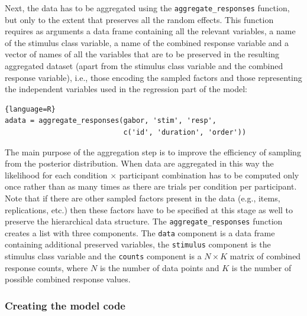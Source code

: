 \documentclass[oneside,a4paper]{article}
\begin{document}
Next, the data has to be aggregated using the
\texttt{aggregate\_responses} function, but only to the extent that
preserves all the random effects. This function requires as arguments
a data frame containing
all the relevant variables, a name of the stimulus class variable, a
name of the combined response variable and a vector of names of all
the variables that are to be preserved in the resulting aggregated
dataset (apart from the stimulus class variable and the combined
response variable), i.e., those encoding the sampled factors and those
representing the independent variables used in the regression part of
the model:

\begin{lstlisting}{language=R}
adata = aggregate_responses(gabor, 'stim', 'resp', 
                            c('id', 'duration', 'order'))  
\end{lstlisting}

The main purpose of the aggregation step is to improve the efficiency
of sampling from the posterior distribution. When data are aggregated
in this way the likelihood for each condition $\times$ participant
combination has to be computed only once rather than as many times as
there are trials per condition per participant. Note that if there are
other sampled factors present in the data (e.g., items, replications,
etc.) then these factors have to be specified at this stage as well to
preserve the hierarchical data structure. The
\texttt{aggregate\_responses} function creates a list with three
components. The \texttt{data} component is a data frame containing
additional preserved variables, the \texttt{stimulus} component is the
stimulus class variable and the \texttt{counts} component is a
$N\times K$ matrix of combined response counts, where $N$ is the
number of data points and $K$ is the number of possible combined
response values.

\subsubsection{Creating the model code}
\end{document}
